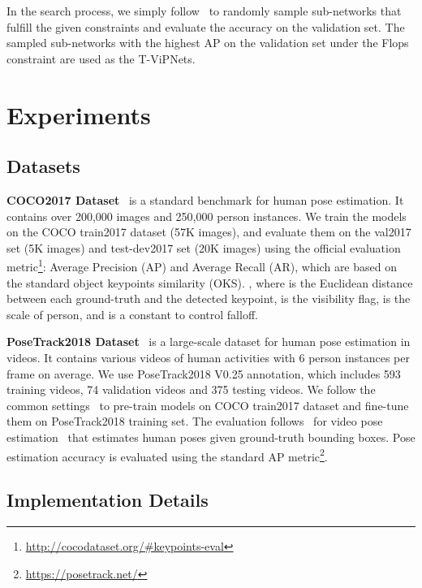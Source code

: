 \documentclass[final]{cvpr}
\begin{document}
\vspace{-5pt}



In the search process, we simply follow~\cite{yu2020bignas} to randomly sample sub-networks that fulfill the given constraints and evaluate the accuracy on the validation set. The sampled sub-networks with the highest AP on the validation set under the Flops constraint are used as the T-ViPNets.



\section{Experiments}

\subsection{Datasets}
\textbf{COCO2017 Dataset}~\cite{lin2014microsoft} is a standard benchmark for human pose estimation. It contains over 200,000 images and 250,000 person instances. We train the models on the COCO train2017 dataset (57K images), and evaluate them on the val2017 set (5K images) and test-dev2017 set (20K images) using the official evaluation metric\footnote{\url{http://cocodataset.org/\#keypoints-eval}}: Average Precision (AP) and Average Recall (AR), which are based on the standard object keypoints similarity (OKS). , where  is the Euclidean distance between each ground-truth and the detected keypoint,  is the visibility flag,  is the scale of person, and  is a constant to control falloff. 

\textbf{PoseTrack2018 Dataset}~\cite{andriluka2018posetrack} is a large-scale dataset for human pose estimation in videos. It contains various videos of human activities with 6 person instances per frame on average. We use PoseTrack2018 V0.25 annotation, which includes 593 training videos, 74 validation videos and 375 testing videos. We follow the common settings~\cite{ning2019lighttrack,sun2019deep,xiao2018simple} to pre-train models on COCO train2017 dataset and fine-tune them on PoseTrack2018 training set. The evaluation follows~\cite{lihh2019temporal,liwt2019temporal,luo2018lstm,nie2019dynamic} for video pose estimation~\cite{jhuang2013towards,zhang2013actemes} that estimates human poses given ground-truth bounding boxes. Pose estimation accuracy is evaluated
using the standard AP metric\footnote{\url{https://posetrack.net/}}.

\subsection{Implementation Details}
\end{document}
